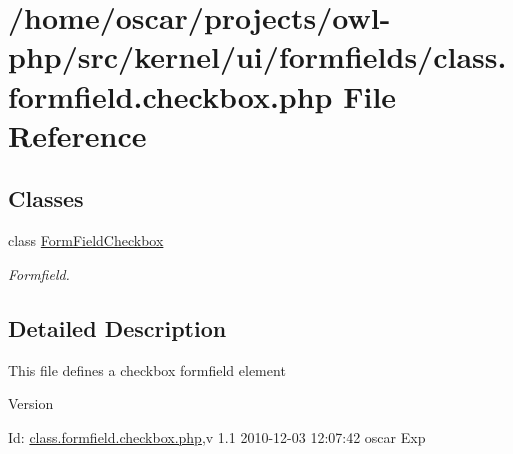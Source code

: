 \section{/home/oscar/projects/owl-\/php/src/kernel/ui/formfields/class.formfield.checkbox.php File Reference}
\label{class_8formfield_8checkbox_8php}
\subsection*{Classes}
\begin{DoxyCompactItemize}
\item 
class \hyperlink{classFormFieldCheckbox}{FormFieldCheckbox}
\begin{DoxyCompactList}\small\item\em Formfield. \item\end{DoxyCompactList}\end{DoxyCompactItemize}


\subsection{Detailed Description}
This file defines a checkbox formfield element \begin{DoxyVersion}{Version}

\end{DoxyVersion}
\begin{DoxyParagraph}{Id:}
\hyperlink{class_8formfield_8checkbox_8php}{class.formfield.checkbox.php},v 1.1 2010-\/12-\/03 12:07:42 oscar Exp 
\end{DoxyParagraph}

